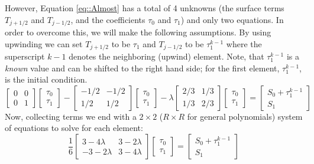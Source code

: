 \documentclass{article}
\begin{document}
However, Equation \ref{eq::Almost} has a total of 4 unknowns (the surface terms $T_{j+1/2}$ and $T_{j-1/2}$, and the coefficients $\tau_0$ and $\tau_1$) and only two equations. In order to overcome this, we will make the following assumptions. By using upwinding we can set $T_{j+1/2}$ to be $\tau_1$ and $T_{j-1/2}$ to be $\tau_1^{k-1}$ where the superscript $k-1$ denotes the neighboring (upwind) element. Note, that $\tau_1^{k-1}$ is a \textit{known} value and can be shifted to the right hand side; for the first element, $\tau_1^{k-1}$, is the initial condition.
\begin{equation}
\begin{bmatrix} 0 & 0 \\ 0 & 1 \end{bmatrix} \begin{bmatrix} \tau_0 \\ \tau_1 \end{bmatrix} - \begin{bmatrix} -1/2 & -1/2 \\ 1/2 & 1/2  \end{bmatrix} \begin{bmatrix} \tau_0 \\ \tau_1 \end{bmatrix} - \lambda\begin{bmatrix} 2/3 & 1/3 \\ 1/3 & 2/3  \end{bmatrix} \begin{bmatrix} \tau_0 \\ \tau_1 \end{bmatrix} = \begin{bmatrix} S_0+\tau_1^{k-1} \\ S_1 \end{bmatrix}
\end{equation}
Now, collecting terms we end with a $2\times 2$ ($R\times R$ for general polynomials) system of equations to solve for each element:
\begin{equation}
\frac{1}{6}\begin{bmatrix} 3-4\lambda & 3-2\lambda \\ -3-2\lambda & 3-4\lambda \end{bmatrix} \begin{bmatrix} \tau_0 \\ \tau_1 \end{bmatrix} =  \begin{bmatrix} S_0+\tau_1^{k-1} \\ S_1 \end{bmatrix}
\end{equation}
\end{document}
